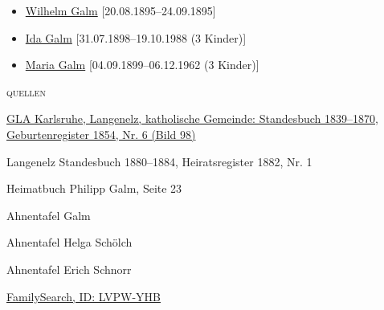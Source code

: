 \begin{person}[
    surname = {Galm},
    givenname = {Franz Karl},
    suffix = {1854--1934},
    label = {@I144@},
    filename = {Karl Galm (1854)}
    ]
\begin{itemize}
\item \hyperref[@I2032@]{Wilhelm Galm} [20.08.1895--24.09.1895]
\item \hyperref[@I168@]{Ida Galm} [31.07.1898--19.10.1988 (3 Kinder)]
\item \hyperref[@I169@]{Maria Galm} [04.09.1899--06.12.1962 (3 Kinder)]
\end{itemize}
\medbreak
\textsc{{quellen}}
\begin{enumerate}[label={[\arabic*]}]
\item \href{http://www.landesarchiv-bw.de/plink/?f=4-1119438-98}{GLA Karlsruhe, Langenelz, katholische Gemeinde: Standesbuch 1839–1870, Geburtenregister 1854, Nr. 6 (Bild 98)}
\item Langenelz Standesbuch 1880–1884, Heiratsregister 1882, Nr. 1
\item Heimatbuch Philipp Galm, Seite 23
\item Ahnentafel Galm
\item Ahnentafel Helga Schölch
\item Ahnentafel Erich Schnorr
\item \href{https://www.familysearch.org/tree/person/details/LVPW-YHB}{FamilySearch, ID: LVPW-YHB}
\end{enumerate}

\end{person}

